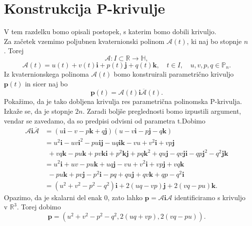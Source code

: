 \documentclass[mat1]{fmfdelo}
\newcommand{\R}{\mathbb R}
\newcommand{\HH}{\mathbb H}
\newcommand{\ii}{\boldsymbol i}
\newcommand{\jj}{\boldsymbol j}
\newcommand{\kk}{\boldsymbol k}
\newcommand{\pp}{\boldsymbol p}
\newcommand{\A}{\mathcal A}
\begin{document}
\section{Konstrukcija P-krivulje}
V tem razdelku bomo opisali postopek, s katerim bomo dobili krivuljo.\\
Za začetek vzemimo poljubnen kvaternionski polinom $\mathcal{A}(t)$, ki naj bo stopnje $n$. Torej
\begin{equation*}
\mathcal{A}: I \subset \R \rightarrow \HH,
\end{equation*}
\begin{equation*}
\mathcal{A}(t) = u(t) + v(t) \mathbf{i} + p(t) \mathbf{j} + q(t) \mathbf{k}, \quad t \in I,\quad u,v,p,q \in \mathbb{P}_n.
\end{equation*}
Iz kvaternionskega polinoma $\mathcal{A}(t)$ bomo konstruirali parametrično krivuljo $\mathbf{p}(t)$ in sicer naj bo
\begin{equation}
\boldsymbol{p}(t) = \mathcal{A}(t) \boldsymbol{i} \overline{\mathcal{A}}(t).
\end{equation}
Pokažimo, da je tako dobljena krivulja res parametrična polinomska P-krivulja. Izkaže se, da je stopnje $2n$. Zaradi boljše preglednosti bomo izpustili argument, vendar se zavedamo, da so predpisi odvisni od parametra t.Dobimo
\begin{equation*}
\begin{split}
\mathcal{A}\boldsymbol{i}\overline{\mathcal{A}} & =(u\boldsymbol{i}-v-p\boldsymbol{k}+q\boldsymbol{j})(u-v\boldsymbol{i}-p\boldsymbol{j}-q\boldsymbol{k}) \\
&= u^2 \ii -uv\ii^2-pu\ii\jj - uq\ii\kk - vu + v^2\ii + vp\jj\\
&~~ +vq\kk - pu\kk + pv\kk\ii + p^2 \kk\jj + pq\kk^2 + qu\jj - qv\jj\ii - qp\jj^2 -q^2\jj\kk \\
& = u^2\ii + uv - pu\kk + uq\jj -vu+v^2\ii +vp\jj + vq\kk \\
& ~~-pu\kk+pv\jj-p^2\ii-pq+qu\jj+qv\kk+qp-q^2\ii \\
& = (u^2+v^2-p^2-q^2)\ii + 2(uq-vp)\jj +2(vq-pu)\kk.
\end{split}
\end{equation*}
Opazimo, da je skalarni del enak 0, zato lahko $\pp = \A\ii\A$ identificiramo s krivuljo v $\R^3$. Torej dobimo
\begin{equation*}
\pp = (u^2+v^2-p^2-q^2, 2(uq+vp),2(vq-pu)).
\end{equation*}
\end{document}
